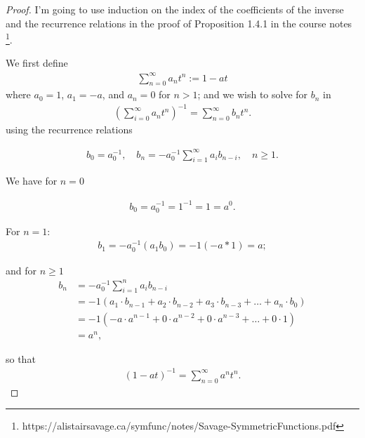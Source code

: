 \documentclass[12pt]{extarticle}
\newcommand{\<}{\langle}
\renewcommand{\>}{\rangle}
\theoremstyle{definition}
\begin{document}
\begin{proof}
  I'm going to use induction on the index of the coefficients of the inverse and the recurrence relations in the proof of Proposition 1.4.1 in the course notes \footnote{https://alistairsavage.ca/symfunc/notes/Savage-SymmetricFunctions.pdf}.

  We first define
  \begin{align*}
   \sum\limits_{n=0}^{\infty} a_nt^n :=  1-at
  \end{align*}
  where $a_0 = 1$, $a_1 = -a$, and $a_n = 0$ for $n > 1$; and we wish to solve for $b_n$ in 
  \begin{align*}
    (\sum\limits_{i=0}^{\infty} a_nt^n)^{-1}  = \sum\limits_{n=0}^{\infty} b_n t^n.
  \end{align*}
  using the recurrence relations

  \begin{align*}
    b_0 = a_0^{-1}, \quad b_n = -a_0^{-1} \sum\limits_{i=1}^{\infty}a_i b_{n-i}, \quad n \geq 1.
  \end{align*}

  We have for $n=0$

  \begin{align*}
    b_0 = a_0^{-1}= 1^{-1} = 1 = a^0.
  \end{align*}

  For $n=1$:
  \begin{align*}
    b_1 = -a_0^{-1}(a_1 b_0) = -1 (-a*1) = a;
  \end{align*}

  and for $n \geq 1$
  \begin{align*}
    b_n
    &= -a_0^{-1}\sum\limits_{i=1}^n a_i b_{n-i} \\
    &= -1 (a_1\cdot b_{n-1} + a_2 \cdot b_{n-2} + a_3 \cdot b_{n-3} + \dots + a_n \cdot b_0) \\
    &= -1 (-a \cdot a^{n-1} + 0 \cdot a^{n-2} + 0 \cdot a^{n-3} + \dots + 0 \cdot1) \\
    &= a^n,
  \end{align*}

  so that
    \begin{align*}
    (1-at)^{-1} = \sum\limits_{n=0}^{\infty} a^n t^n.
  \end{align*}

\end{proof}
\end{document}

